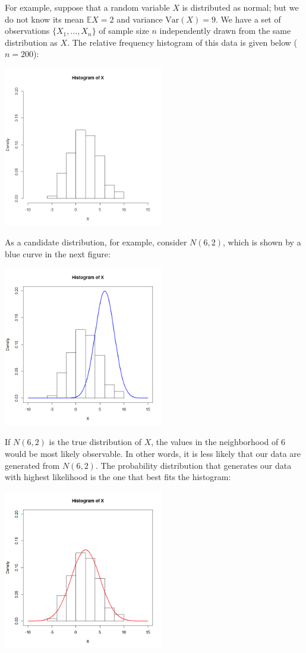 \documentclass[10.5pt, A4paper, openany, uplatex]{book}
\newcommand{\E}{\mathbb{E}}
\newcommand{\Var}{\mathrm{Var}}
\numberwithin{equation}{section}
\begin{document}
For example, suppose that a random variable $X$ is distributed as normal; but we do not know its mean $\E X = 2$ and variance $\Var(X) = 9$.
We have a set of observations $\{X_1, \ldots ,X_n\}$ of sample size $n$ independently drawn from the same distribution as $X$.
The relative frequency histogram of this data is given below ($n = 200$):
\begin{center}
	\includegraphics[width=7cm]{hist.png}
\end{center}
As a candidate distribution, for example, consider $N(6, 2)$, which is shown by a blue curve in the next figure:
\begin{center}
\includegraphics[width=7cm]{hist2.png}
\end{center}
If $N(6, 2)$ is the true distribution of $X$, the values in the neighborhood of $6$ would be most likely observable.
In other words, it is less likely that our data are generated from $N(6, 2)$.
The probability distribution that generates our data with highest likelihood is the one that best fits the histogram:
\begin{center}
\includegraphics[width=7cm]{hist3.png}
\end{center}
\end{document}
